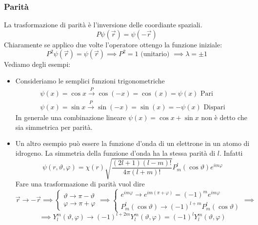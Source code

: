 \subsubsection{Parità}
La trasformazione di parità è l'inversione delle coordiante spaziali. 
\begin{equation*}
    P\psi(\vec r)=\psi(-\vec r)
\end{equation*}
Chiaramente se applico due volte l'operatore ottengo la funzione iniziale:
\begin{equation*}
P^2\psi(\vec r)=\psi(\vec r)\implies P^2=1 \text{ (unitario) }\implies \lambda=\pm 1
\end{equation*}
Vediamo degli esempi:
\begin{itemize}
    \item Consideriamo le semplici funzioni trigonometriche 
    \begin{gather*}
        \psi(x)=\cos x \overset{P}{\longrightarrow}\cos(-x)=\cos(x)=\psi(x)\text{ Pari} \\
        \psi(x)=\sin x \overset{P}{\longrightarrow}\sin(-x)=\sin(x)=-\psi(x)\text{ Dispari} 
    \end{gather*}
    In generale una combinazione lineare $\psi(x)=\cos x+\sin x$ non è detto che sia simmetrica per parità.
    \item Un altro esempio può essere la funzione d'onda di un elettrone in un atomo di idrogeno. La simmetria della funzione d'onda ha la stessa parità di $l$. Infatti
    \begin{equation*}
        \psi(r,\vartheta,\varphi)=\chi(r)\sqrt{\frac{(2l+1)(l-m)!}{4\pi(l+m)!}}P_m^l(\cos\vartheta)e^{im\varphi}
    \end{equation*}
    Fare una trasformazione di parità vuol dire 
    \begin{equation*}
    \vec r\to-\vec r\implies 
    \begin{cases}
        \vartheta\to\pi-\vartheta\\
        \varphi\to\pi+\varphi
    \end{cases}\implies 
    \begin{cases}
    e^{im\varphi}\to e^{im(\pi+\varphi)}=(-1)^me^{im\varphi}\\
    P_m^l(\cos\vartheta)\to (-1)^{l+m}P_m^l(\cos\vartheta)
    \end{cases}\implies 
    \end{equation*}
    \begin{equation*}
    \implies Y_l^m(\vartheta,\varphi)\to (-1)^{l+2m}Y_l^m(\vartheta,\varphi)=(-1)^lY_l^m(\vartheta,\varphi)

\end{equation*}
\end{itemize}
